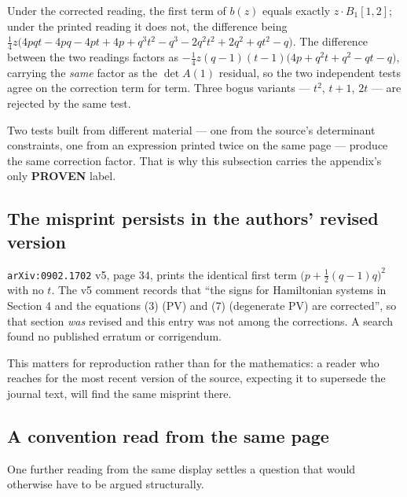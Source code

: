 \begin{remark}
Under the corrected reading, the first term of $b(z)$ equals exactly
$z\cdot B_1[1,2]$; under the printed reading it does not, the difference being
$\tfrac14 z\bigl(4pqt-4pq-4pt+4p+q^{3}t^{2}-q^{3}-2q^{2}t^{2}+2q^{2}+qt^{2}-q\bigr)$.
The difference between the two readings factors as
$-\tfrac14 z(q-1)(t-1)\bigl(4p+q^{2}t+q^{2}-qt-q\bigr)$, carrying the
\emph{same} factor as the $\det A(1)$ residual, so the two independent tests
agree on the correction term for term. Three bogus variants --- $t^{2}$, $t+1$,
$2t$ --- are rejected by the same test.
\end{remark}

Two tests built from different material --- one from the source's determinant
constraints, one from an expression printed twice on the same page --- produce
the same correction factor. That is why this subsection carries the appendix's
only \textbf{PROVEN} label.

\subsection{The misprint persists in the authors' revised version}\label{ssec:typo-arxiv}

\begin{remark}
\texttt{arXiv:0902.1702} v5, page $34$, prints the identical first term
$\bigl(p+\tfrac12(q-1)q\bigr)^{2}$ with no $t$. The v5 comment records that
``the signs for Hamiltonian systems in Section 4 and the equations (3) (PV) and
(7) (degenerate PV) are corrected'', so that section \emph{was} revised and
this entry was not among the corrections. A search found no published erratum
or corrigendum.
\end{remark}

This matters for reproduction rather than for the mathematics: a reader who
reaches for the most recent version of the source, expecting it to supersede
the journal text, will find the same misprint there.

\subsection{A convention read from the same page}\label{ssec:typo-convention}

One further reading from the same display settles a question that would
otherwise have to be argued structurally.

